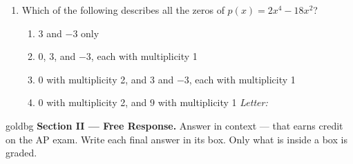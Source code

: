 \documentclass[10pt]{article}
\begin{document}
\begin{enumerate}[leftmargin=1.9em, itemsep=24pt]
\item Which of the following describes all the zeros of $p(x) = 2x^4 - 18x^2$?
      \begin{enumerate}[leftmargin=2.6em, itemsep=2pt]
        \item[(A)] $3$ and $-3$ only
        \item[(B)] $0$, $3$, and $-3$, each with multiplicity 1
        \item[(C)] $0$ with multiplicity 2, and $3$ and $-3$, each with multiplicity 1
        \item[(D)] $0$ with multiplicity 2, and $9$ with multiplicity 1 \hfill\textit{Letter:}~\gradedblank[id=ap5, type=choice, points=1, answer=C]{0.42in}{13pt}
      \end{enumerate}

\end{enumerate}

\newpage

\begin{headlinebox}{goldbg}
\small
\textbf{Section II --- Free Response.} Answer in context --- that earns credit on the AP exam.
Write each final answer in its box. Only what is inside a box is graded.
\end{headlinebox}

\vspace{0.04in}
\end{document}
